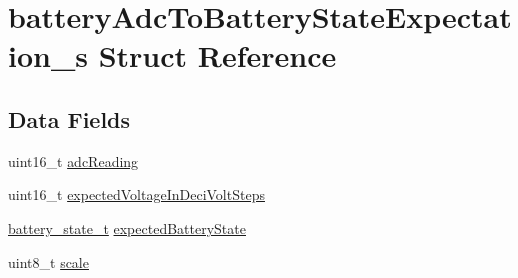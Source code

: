 \hypertarget{structbatteryAdcToBatteryStateExpectation__s}{\section{battery\+Adc\+To\+Battery\+State\+Expectation\+\_\+s Struct Reference}
\label{structbatteryAdcToBatteryStateExpectation__s}
}
\subsection*{Data Fields}
\begin{DoxyCompactItemize}
\item 
uint16\+\_\+t \hyperlink{structbatteryAdcToBatteryStateExpectation__s_a02ec829cf1f40240cfa142e4699ba126}{adc\+Reading}
\item 
uint16\+\_\+t \hyperlink{structbatteryAdcToBatteryStateExpectation__s_ac3970ac30db8b2c33e7f03c9ba577b6b}{expected\+Voltage\+In\+Deci\+Volt\+Steps}
\item 
\hyperlink{sensors_2battery_8h_a22b38b26763aa629baa29efb37a4e993}{battery\+\_\+state\+\_\+t} \hyperlink{structbatteryAdcToBatteryStateExpectation__s_ae773767da49e0b544d3fcd861f71ee76}{expected\+Battery\+State}
\item 
uint8\+\_\+t \hyperlink{structbatteryAdcToBatteryStateExpectation__s_a49da24e721f379273137885ab365f5b2}{scale}
\end{DoxyCompactItemize}



